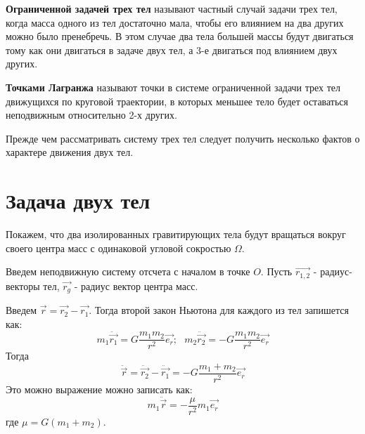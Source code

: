 \documentclass[a4paper]{article} %
\newcommand*{\nnd}{\noindent} %
\begin{document}
\textbf{Ограниченной задачей трех тел} называют частный случай задачи трех тел, когда масса одного из тел достаточно мала, чтобы его влиянием на два других можно было пренебречь. В этом случае два тела большей массы будут двигаться тому как они двигаться в задаче двух тел, а 3-е двигаться под влиянием двух других.

\textbf{Точками Лагранжа} называют точки в системе ограниченной задачи трех тел движущихся по круговой траектории, в которых меньшее тело будет оставаться неподвижным относительно 2-х других.

Прежде чем рассматривать систему трех тел следует получить несколько фактов о характере движения двух тел.

\section{Задача двух тел}




Покажем, что два изолированных гравитирующих тела будут вращаться вокруг своего центра масс с одинаковой угловой сокростью $\Omega$.

Введем неподвижную систему отсчета с началом в точке $O$. Пусть $\vec{r_{1,2}}$ - радиус-векторы тел, $\vec{r_g}$ - радиус вектор центра масс.

Введем $\vec{r} = \vec{r_2} - \vec{r_1}$. Тогда второй закон Ньютона для каждого из тел запишется как:
\begin{equation}
m_1\ddot{\vec{r_1}} = G\frac{m_1 m_2}{r^2}\vec{e_r};\text{ }m_2\ddot{\vec{r_2}} = -G\frac{m_1 m_2}{r^2}\vec{e_r} 
\end{equation}
Тогда
\begin{equation}
\ddot{\vec{r}} = \ddot{\vec{r_2}} - \ddot{\vec{r_1}} = -G\frac{m_1 + m_2}{r^2}\vec{e_r}
\end{equation}
Это можно выражение можно записать как:
\begin{equation}
m_1\ddot{\vec{r}} = -\frac{\mu}{r^2}m_1\vec{e_r}
\label{3}
\end{equation}
где $\mu = G(m_1 + m_2)$.
\end{document}
